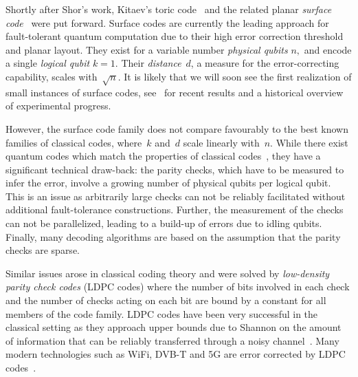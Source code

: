 \documentclass[amsmath, amssymb, floatfix, reprint, twocolumn, notitlepage, 10pt]{revtex4-1}
\newcommand{\changetwo}{}
\begin{document}
Shortly after Shor's work, Kitaev's toric code~\cite{kitaev1997quantum,kitaev2003fault} and the related planar \emph{surface code}~\cite{freedman2001projective,bravyi1998quantum} were put forward. 
Surface codes are currently the leading approach for fault-tolerant quantum computation due to their high error correction threshold and planar layout. 
They exist for a variable number \emph{physical qubits} $n,$ and encode a single \emph{logical qubit} $k = 1$. 
Their \emph{distance}~$d$, a measure for the error-correcting capability, scales with~$\sqrt{n}.$ 
It is likely that we will soon see the first realization of small instances of surface codes, see~\cite{chen2021exponential} for recent results and a historical overview of experimental progress.

However, the surface code family does not compare favourably to the best known families of classical codes, where~$k$ and~$d$ scale linearly with~$n.$
While there exist quantum codes which match the properties of classical codes~\cite{calderbank1996good,ashikhmin2001asymptotically}, they have a significant technical draw-back: 
the parity checks, which have to be measured to infer the error, involve a growing number of physical qubits {\changetwo per logical qubit.}
This is an issue as arbitrarily large checks can not be reliably facilitated {\changetwo without additional fault-tolerance constructions}.
Further, the measurement of the checks can not be parallelized, leading to a build-up of errors due to idling qubits. Finally, many  decoding algorithms are based on the assumption that the parity checks are sparse.

Similar issues arose in classical coding theory and were solved by \emph{low-density parity check codes} (LDPC codes) where the number of bits involved in each check and the number of checks acting on each bit are bound by a constant for all members of the code family. 
LDPC codes have been very successful in the classical setting as they approach upper bounds due to Shannon on the amount of information that can be reliably transferred through a noisy channel~\cite{gallager1962low,mackay1996near}.
Many modern technologies such as WiFi, DVB-T and 5G are error corrected by LDPC codes~\cite{iliev2008application}.
\end{document}
